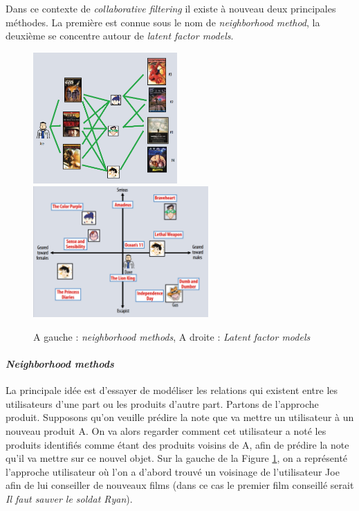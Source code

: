\documentclass[10pt,a4paper]{article}
\begin{document}
Dans ce contexte de \textit{collaborative filtering} il existe à nouveau deux principales méthodes. La première est connue sous le nom de \textit{neighborhood method}, la deuxième se concentre autour de \textit{latent factor models}.

\begin{figure}[ht!]
\begin{center}
\includegraphics[height=5cm]{fig/neighboor_representation.png}
\includegraphics[height=5cm]{fig/factor_representation.png}
\caption{\label{nmet} A gauche : \textit{neighborhood methods}, A droite : \textit{Latent factor models}}
\end{center}
\end{figure}


\paragraph{\textit{Neighborhood methods}}

La principale idée est d'essayer de modéliser les relations qui existent entre les utilisateurs d'une part ou les produits d'autre part. Partons de l'approche produit. Supposons qu'on veuille prédire la note que va mettre un utilisateur à un nouveau produit A. On va alors regarder comment cet utilisateur a noté les produits identifiés comme étant des produits voisins de A, afin de prédire la note qu'il va mettre sur ce nouvel objet. Sur la gauche de la Figure \ref{nmet}, on a représenté l'approche utilisateur où l'on a d'abord trouvé un voisinage de l'utilisateur Joe afin de lui conseiller de nouveaux films (dans ce cas le premier film conseillé serait \textit{Il faut sauver le soldat Ryan}).
\end{document}
